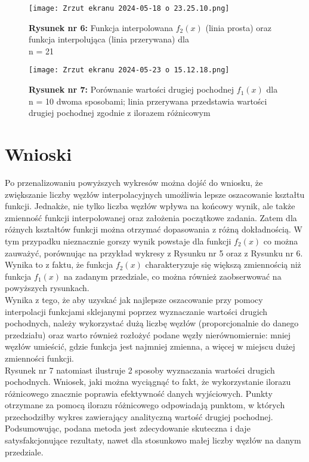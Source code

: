 \documentclass{article}
\begin{document}
\begin{figure}[H]
    \centering
    \texttt{[image: Zrzut ekranu 2024-05-18 o 23.25.10.png]}
    \caption{\textbf{Rysunek nr 6: }Funkcja interpolowana $f_2(x)$ (linia prosta) oraz funkcja interpolująca (linia przerywana) dla \\ n = 21}
    \label{fig:enter-label}
\end{figure}

\begin{figure}[H]
    \centering
    \texttt{[image: Zrzut ekranu 2024-05-23 o 15.12.18.png]}
    \caption{\textbf{Rysunek nr 7: } Porównanie wartości drugiej pochodnej $f_1(x)$ dla n = 10 dwoma sposobami; linia przerywana przedstawia wartości drugiej pochodnej zgodnie z ilorazem różnicowym}
    \label{fig:enter-label}
\end{figure}

\newpage
\section{Wnioski}

Po przenalizowaniu powyższych wykresów można dojść do wniosku, że zwiększanie liczby węzłów interpolacyjnych umożliwia lepsze oszacowanie kształtu funkcji. Jednakże, nie tylko liczba węzłów wpływa na końcowy wynik, ale także zmienność funkcji interpolowanej oraz założenia początkowe zadania. Zatem dla różnych kształtów funkcji można otrzymać dopasowania z różną dokładnością. W tym przypadku nieznacznie gorszy wynik powstaje dla funkcji $f_2(x)$ co można zauważyć, porównując na przykład wykresy z Rysunku nr 5 oraz z Rysunku nr 6. Wynika to z faktu, że funkcja $f_2(x)$ charakteryzuje się większą zmiennością niż funkcja $f_1(x)$ na zadanym przedziale, co można również zaobserwować na powyższych rysunkach. \\
Wynika z tego, że aby uzyskać jak najlepsze oszacowanie przy pomocy interpolacji funkcjami sklejanymi poprzez wyznaczanie wartości drugich pochodnych, należy wykorzystać dużą liczbę węzłów (proporcjonalnie do danego przedziału) oraz warto również rozłożyć podane węzły nierównomiernie: mniej węzłów umieścić, gdzie funkcja jest najmniej zmienna, a więcej w miejscu dużej zmienności funkcji.\\
Rysunek nr 7 natomiast ilustruje 2 sposoby wyznaczania wartości drugich pochodnych. Wniosek, jaki można wyciągnąć to fakt, że wykorzystanie ilorazu różnicowego znacznie poprawia efektywność danych wyjściowych. Punkty otrzymane za pomocą ilorazu różnicowego odpowiadają punktom, w których przechodziłby wykres zawierający analityczną wartość drugiej pochodnej. \\
Podsumowując, podana metoda jest zdecydowanie skuteczna i daje satysfakcjonujące rezultaty, nawet dla stosunkowo małej liczby węzłów na danym przedziale. 
\end{document}
